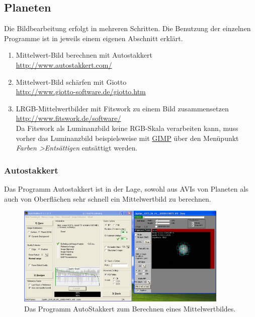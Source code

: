 \documentclass[10pt,a4paper,titlepage]{article}
\begin{document}
\subsection{Planeten}
Die Bildbearbeitung erfolgt in mehreren Schritten. Die Benutzung der einzelnen Programme ist in jeweils einem eigenen Abschnitt erklärt.
\begin{enumerate}
\item Mittelwert-Bild berechnen mit Autostakkert \\ \url{http://www.autostakkert.com/}
\item Mittelwert-Bild schärfen mit Giotto \\ \url{http://www.giotto-software.de/giotto.htm}
\item LRGB-Mittelwertbilder mit Fitswork zu einem Bild zusammensetzen \\ \url{http://www.fitswork.de/software/} \\
Da Fitswork als Luminanzbild keine RGB-Skala verarbeiten kann, muss vorher das Luminanzbild beispielsweise mit \href{http://gimp.org}{GIMP} über den Menüpunkt \textit{Farben \textgreater Entsättigen} entsättigt werden.
\end{enumerate}
\subsubsection{Autostakkert}
Das Programm Autostakkert ist in der Lage, sowohl aus AVIs von Planeten als auch von Oberflächen sehr schnell ein Mittelwertbild zu berechnen.

\begin{figure}[h!]
  \centering
    \includegraphics[width=0.9\textwidth]{AutoStakkert}
  \caption{Das Programm AutoStakkert zum Berechnen eines Mittelwertbildes.}
  \label{fig:autostakkert}
\end{figure}
\end{document}
